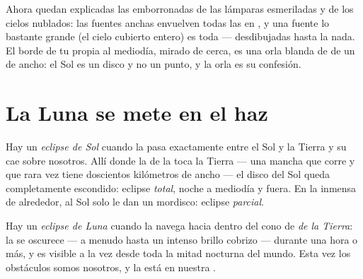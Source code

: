 \begin{example}\label{ex:g7:shadows-eclipses:soft}
Ahora quedan explicadas las  emborronadas de las lámparas
esmeriladas y de los cielos nublados: las fuentes anchas envuelven
todas las  en , y una fuente lo bastante
grande (el cielo cubierto entero) es toda  ---
 desdibujadas hasta la nada. El borde de tu propia
 al mediodía, mirado de cerca, es una orla blanda de 
de un  de ancho: el Sol es un disco y no un punto, y la
orla es su confesión.
\end{example}

\section{La Luna se mete en el haz}

\begin{definition}\label{def:g7:shadows-eclipses:solar}
Hay un \emph{eclipse de Sol} cuando la
 pasa exactamente entre el Sol y la Tierra y su  cae
sobre nosotros. Allí donde la \emph{} de la  toca la
Tierra --- una mancha que corre y que rara vez tiene doscientos
kilómetros de ancho --- el disco del Sol queda completamente
escondido: eclipse \emph{total}, noche a mediodía y 
fuera. En la inmensa \emph{} de alrededor, al Sol solo le dan
un mordisco: eclipse \emph{parcial}.
\end{definition}

\begin{definition}\label{def:g7:shadows-eclipses:lunar}
Hay un \emph{eclipse de Luna} cuando la
\emph{} navega hacia dentro del cono de  \emph{de la
Tierra}: la  se oscurece --- a menudo hasta un intenso
brillo cobrizo --- durante una hora o más, y es visible a la vez desde
toda la mitad nocturna del mundo. Esta vez los obstáculos somos
nosotros, y la  está en nuestra .
\end{definition}

